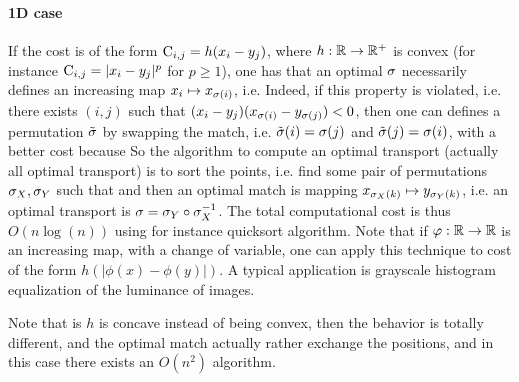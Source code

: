 \paragraph{1D case}

If the cost is of the form $\mathrm{C}_{i,j}=h(x_i-y_j)$, where $h: \mathbb{R} \rightarrow \mathbb{R}^+$ is  convex (for instance $\mathrm{C}_{i,j}=|x_i-y_j|^p$ for $p \geq 1$), one has that an optimal $\sigma$ necessarily defines an increasing map $x_i \mapsto x_{\sigma(i)}$, i.e. 
Indeed, if this property is violated, i.e. there exists $(i,j)$ such that $(x_i-y_j)(x_{\sigma(i)}-y_{\sigma(j)}) < 0$, then one can defines a permutation $\tilde {\sigma}$ by swapping the match, i.e. $\tilde{\sigma}(i)=\sigma(j)$ and $\tilde{\sigma}(j)=\sigma(i)$, with a better cost
because
So the algorithm to compute an optimal transport (actually all optimal transport) is to sort the points, i.e. find some pair of permutations $\sigma_X, \sigma_Y$ such that
and then an optimal match is mapping $x_{\sigma_X(k)} \mapsto y_{\sigma_Y(k)}$, i.e. an optimal transport is $\sigma = \sigma_Y \circ \sigma_X^{-1}$. The total computational cost is thus $O(n\log(n))$ using for instance quicksort algorithm.
%
Note that if $\varphi : \mathbb{R} \rightarrow \mathbb{R}$ is an increasing map, with a change of variable, one can apply this technique to cost of the form $h(|\phi(x)-\phi(y)|)$. 
%
A typical application is grayscale histogram equalization of the luminance of images. 

Note that is $h$ is concave instead of being convex, then the behavior is totally different, and the optimal match actually rather exchange the positions, and in this case there exists an $O(n^2)$ algorithm.   

%
%


